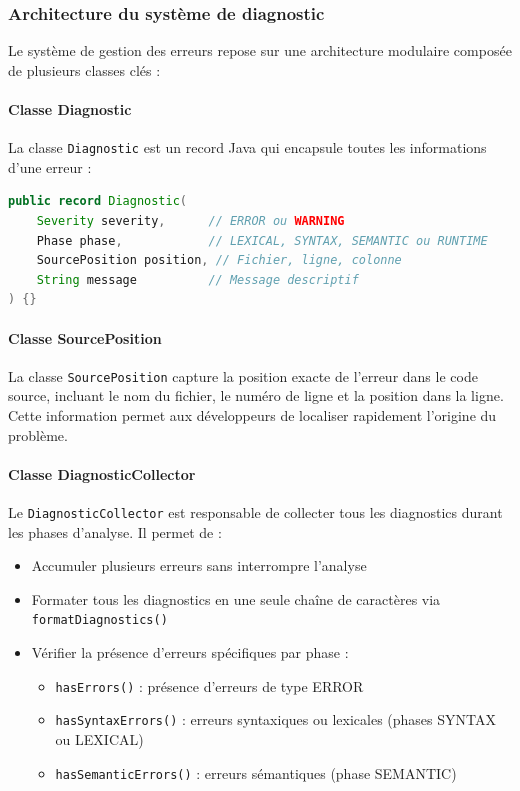 \subsubsection{Architecture du système de diagnostic}

Le système de gestion des erreurs repose sur une architecture modulaire composée de plusieurs classes clés :

\paragraph{Classe Diagnostic}
La classe \texttt{Diagnostic} est un record Java qui encapsule toutes les informations d'une erreur :

\vspace{0.3cm}
\begin{lstlisting}[language=java, caption=Structure du Diagnostic,label={lst:diagnostic-record}]
public record Diagnostic(
    Severity severity,      // ERROR ou WARNING
    Phase phase,            // LEXICAL, SYNTAX, SEMANTIC ou RUNTIME
    SourcePosition position, // Fichier, ligne, colonne
    String message          // Message descriptif
) {}
\end{lstlisting}

\paragraph{Classe SourcePosition}
La classe \texttt{SourcePosition} capture la position exacte de l'erreur dans le code source, incluant le nom du fichier, le numéro de ligne et la position dans la ligne.
Cette information permet aux développeurs de localiser rapidement l'origine du problème.

\paragraph{Classe DiagnosticCollector}
Le \texttt{DiagnosticCollector} est responsable de collecter tous les diagnostics durant les phases d'analyse.
Il permet de :
\begin{itemize}
    \item Accumuler plusieurs erreurs sans interrompre l'analyse
    \item Formater tous les diagnostics en une seule chaîne de caractères via \texttt{formatDiagnostics()}
    \item Vérifier la présence d'erreurs spécifiques par phase :
    \begin{itemize}
        \item \texttt{hasErrors()} : présence d'erreurs de type ERROR
        \item \texttt{hasSyntaxErrors()} : erreurs syntaxiques ou lexicales (phases SYNTAX ou LEXICAL)
        \item \texttt{hasSemanticErrors()} : erreurs sémantiques (phase SEMANTIC)
    \end{itemize}
\end{itemize}

